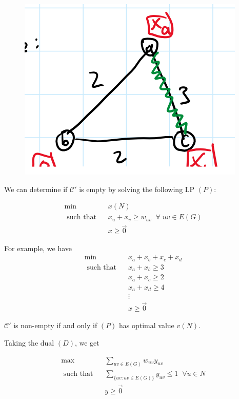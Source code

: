 \documentclass[twoside]{article}
\begin{document}
\begin{center}
	\begin{figure}[h!]
		\includegraphics[]{matching_game_4.png}
	\end{figure}
\end{center}

We can determine if $\mathcal{C}'$ is empty by solving the following LP $(P)$: 

\begin{align*}
	\min              & \;\;\;x(N)                                              \\
	\text{ such that} & \;\;\;x_u + x_v \geq w_{uv} \;\; \forall \; uv \in E(G) \\
	                  & \;\;\; x\geq \vec{0}                                    
\end{align*}

For example, we have \begin{align*}
\min &\;\;\;x_a + x_b + x_c + x_d\\
\text{ such that} &\;\;\;x_a + x_b \geq 3\\
&\;\;\; x_a + x_c \geq 2\\
&\;\;\; x_a + x_d \geq 4\\
&\;\;\; \vdots\\
&\;\;\; x\geq \vec{0}
\end{align*}

$\mathcal{C}'$ is non-empty if and only if $(P)$ has optimal value $v(N)$. 

Taking the dual $(D)$, we get 

\begin{align*}
	\max              & \;\;\;\sum_{uv \in E(G)} w_{uv} y_{uv}                             \\
	\text{ such that} & \;\;\;\sum_{\{uv : uv \in E(G)\}}y_{uv} \leq 1 \;\;\forall u \in N \\
	                  & \;\;\; y\geq \vec{0}                                               
\end{align*}
\end{document}

